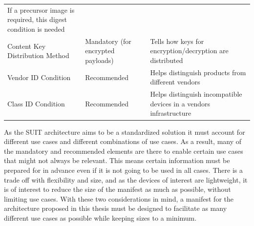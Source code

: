 \documentclass[0-thesis.tex]{subfiles}
\begin{document}
\begin{small}
\begin{longtable}[]{@{}lll@{}}
\begin{minipage}[t]{0.42\columnwidth}
    If a precursor image is required, this digest condition is needed\strut
    \end{minipage}\tabularnewline
    \begin{minipage}[t]{0.23\columnwidth}\raggedright\strut
    Content Key Distribution Method\strut
    \end{minipage} & \begin{minipage}[t]{0.26\columnwidth}\raggedright\strut
    Mandatory (for encrypted payloads)\strut
    \end{minipage} & \begin{minipage}[t]{0.42\columnwidth}\raggedright\strut
    Tells how keys for encryption/decryption are distributed\strut
    \end{minipage}\tabularnewline
    \begin{minipage}[t]{0.23\columnwidth}\raggedright\strut
    Vendor ID Condition\strut
    \end{minipage} & \begin{minipage}[t]{0.26\columnwidth}\raggedright\strut
    Recommended\strut
    \end{minipage} & \begin{minipage}[t]{0.42\columnwidth}\raggedright\strut
    Helps distinguish products from different vendors\strut
    \end{minipage}\tabularnewline
    \begin{minipage}[t]{0.23\columnwidth}\raggedright\strut
    Class ID Condition\strut
    \end{minipage} & \begin{minipage}[t]{0.26\columnwidth}\raggedright\strut
    Recommended\strut
    \end{minipage} & \begin{minipage}[t]{0.42\columnwidth}\raggedright\strut
    Helps distinguish incompatible devices in a vendors infrastructure\strut
    \end{minipage}\tabularnewline
    \bottomrule
\end{longtable}
\end{small}

As the SUIT architecture aims to be a standardized solution it must account for different
use cases and different combinations of use cases. As a result, many of the mandatory and
recommended elements are there to enable certain use cases that might not always be
relevant. This means certain information must be prepared for in advance even if it is not
going to be used in all cases. There is a trade off with flexibility and size, and as the
devices of interest are lightweight, it is of interest to reduce the size of the manifest
as much as possible, without limiting use cases. With these two considerations in mind, a
manifest for the architecture proposed in this thesis must be designed to facilitate as
many different use cases as possible while keeping sizes to a minimum.
\end{document}
